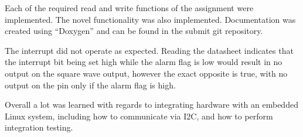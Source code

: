 Each of the required read and write functions of the assignment were implemented.
The novel functionality was also implemented. Documentation was created
using ``Doxygen'' and can be found in the submit git repository.

The interrupt
did not operate as expected. Reading the datasheet indicates that the interrupt
bit being set high while the alarm flag is low would result in no output on the
square wave output, however the exact opposite is true, with no output on the
pin only if the alarm flag is high.

Overall a lot was learned with regards to integrating hardware with an embedded
Linux system, including how to communicate via I2C, and how to perform
integration testing.
